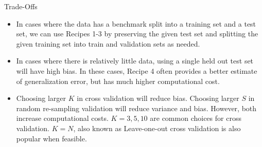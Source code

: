 \documentclass[serif,xcolor=pdftex,dvipsnames,table,hyperref={bookmarks=false}]{beamer}
\begin{document}
\begin{frame}[t]{Trade-Offs}
\begin{itemize}
\setlength{\itemsep}{6pt}

\item In cases where the data has a benchmark split into a training set and a test set, we can use Recipes 1-3 by preserving the given test set and splitting the given training set into train and validation sets as needed.

\pause\item In cases where there is relatively little data, using a single held out test set will have high bias. In these cases, Recipe 4 often provides a better estimate of generalization error, but has much higher computational cost.

\pause\item Choosing larger $K$ in cross validation will reduce bias. Choosing larger $S$ in random re-sampling validation will reduce variance and bias. However, both increase computational costs. $K=3,5,10$ are common choices for cross validation. $K=N$, also known as Leave-one-out cross validation is also popular when feasible. 

\end{itemize}
\end{frame}
\end{document}
